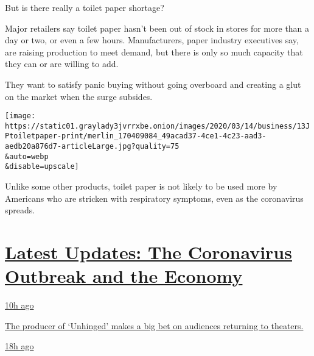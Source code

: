 But is there really a toilet paper shortage?

Major retailers say toilet paper hasn't been out of stock in stores for
more than a day or two, or even a few hours. Manufacturers, paper
industry executives say, are raising production to meet demand, but
there is only so much capacity that they can or are willing to add.

They want to satisfy panic buying without going overboard and creating a
glut on the market when the surge subsides.

\texttt{[image: https://static01.graylady3jvrrxbe.onion/images/2020/03/14/business/13JPtoiletpaper-print/merlin\_170409084\_49acad37-4ce1-4c23-aad3-aedb20a876d7-articleLarge.jpg?quality=75\\\&auto=webp\\\&disable=upscale]}

Unlike some other products, toilet paper is not likely to be used more
by Americans who are stricken with respiratory symptoms, even as the
coronavirus spreads.

\hypertarget{latest-updates-the-coronavirus-outbreak-and-the-economy}{%
\section{\texorpdfstring{\href{https://www.nytimes3xbfgragh.onion/live/2020/08/20/business/stock-market-today-coronavirus?action=click\&pgtype=Article\&state=default\&region=MAIN_CONTENT_1\&context=storylines_live_updates}{Latest
Updates: The Coronavirus Outbreak and the
Economy}}{Latest Updates: The Coronavirus Outbreak and the Economy}}\label{latest-updates-the-coronavirus-outbreak-and-the-economy}}

\href{https://www.nytimes3xbfgragh.onion/live/2020/08/20/business/stock-market-today-coronavirus?action=click\&pgtype=Article\&state=default\&region=MAIN_CONTENT_1\&context=storylines_live_updates\#the-producer-of-unhinged-makes-a-big-bet-on-audiences-returning-to-theaters}{10h
ago}

\href{https://www.nytimes3xbfgragh.onion/live/2020/08/20/business/stock-market-today-coronavirus?action=click\&pgtype=Article\&state=default\&region=MAIN_CONTENT_1\&context=storylines_live_updates\#the-producer-of-unhinged-makes-a-big-bet-on-audiences-returning-to-theaters}{The
producer of `Unhinged' makes a big bet on audiences returning to
theaters.}

\href{https://www.nytimes3xbfgragh.onion/live/2020/08/20/business/stock-market-today-coronavirus?action=click\&pgtype=Article\&state=default\&region=MAIN_CONTENT_1\&context=storylines_live_updates\#american-airlines-to-stop-flights-to-15-cities-after-government-aid-ends}{18h
ago}


